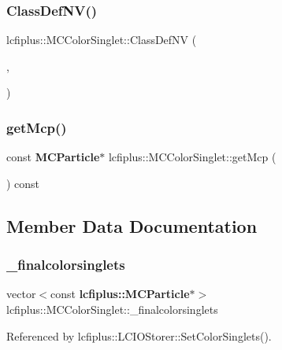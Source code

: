 \subsubsection{Class\+Def\+N\+V()}
{\footnotesize\ttfamily lcfiplus\+::\+M\+C\+Color\+Singlet\+::\+Class\+Def\+NV (\begin{DoxyParamCaption}\item[{\textbf{ lcfiplus\+::\+M\+C\+Color\+Singlet}}]{,  }\item[{1}]{ }\end{DoxyParamCaption})}

\mbox{\label{classlcfiplus_1_1MCColorSinglet_a78b1af70c69afa6d5efed4e89475884f}} 
\subsubsection{get\+Mcp()}
{\footnotesize\ttfamily const \textbf{ M\+C\+Particle}$\ast$ lcfiplus\+::\+M\+C\+Color\+Singlet\+::get\+Mcp (\begin{DoxyParamCaption}{ }\end{DoxyParamCaption}) const\hspace{0.3cm}{\ttfamily [inline]}}



\subsection{Member Data Documentation}
\mbox{\label{classlcfiplus_1_1MCColorSinglet_a4d282950fc805507b40128243a5bc438}} 
\subsubsection{\+\_\+finalcolorsinglets}
{\footnotesize\ttfamily vector$<$const \textbf{ lcfiplus\+::\+M\+C\+Particle}$\ast$$>$ lcfiplus\+::\+M\+C\+Color\+Singlet\+::\+\_\+finalcolorsinglets}



Referenced by lcfiplus\+::\+L\+C\+I\+O\+Storer\+::\+Set\+Color\+Singlets().

\mbox{\label{classlcfiplus_1_1MCColorSinglet_af1c48b3e54ab5ad06c9f3ada54ec6740}} 
